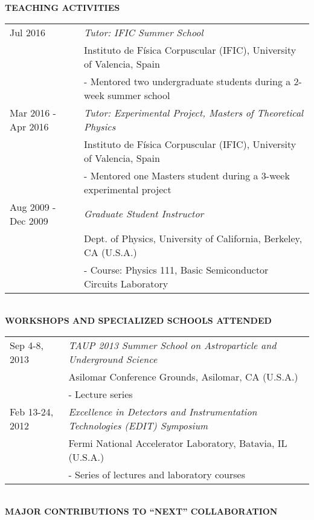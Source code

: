 \newpage
{\noindent\textbf{TEACHING ACTIVITIES}}\\

\begin{tabular}{ll}
	
	Jul 2016 & \emph{Tutor: IFIC Summer School}\\
	& Instituto de F\'{i}sica Corpuscular (IFIC), University of Valencia, Spain\\
	& - Mentored two undergraduate students during a 2-week summer school\\
	
	Mar 2016 - Apr 2016 & \emph{Tutor: Experimental Project, Masters of Theoretical Physics}\\
	& Instituto de F\'{i}sica Corpuscular (IFIC), University of Valencia, Spain\\
	& - Mentored one Masters student during a 3-week experimental project\\
		
	Aug 2009 - Dec 2009 & \emph{Graduate Student Instructor}\\
	& Dept. of Physics, University of California, Berkeley, CA (U.S.A.)\\
	& - Course: Physics 111, Basic Semiconductor Circuits Laboratory\\
\end{tabular}\\

{\noindent\textbf{WORKSHOPS AND SPECIALIZED SCHOOLS ATTENDED}}\\

\begin{tabular}{ll}
	Sep 4-8, 2013 & \emph{TAUP 2013 Summer School on Astroparticle and Underground Science}\\
	& Asilomar Conference Grounds, Asilomar, CA (U.S.A.)\\
	& - Lecture series\\
	
	Feb 13-24, 2012 & \emph{Excellence in Detectors and Instrumentation Technologies (EDIT) Symposium}\\
	& Fermi National Accelerator Laboratory, Batavia, IL (U.S.A.)\\
	& - Series of lectures and laboratory courses
\end{tabular}\\


{\noindent\textbf{MAJOR CONTRIBUTIONS TO ``NEXT'' COLLABORATION}}\\

